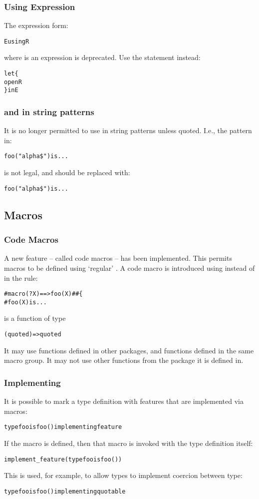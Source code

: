\subsubsection{Using Expression}
The expression form:
\begin{alltt}
E using R
\end{alltt}
where  is an expression is deprecated. Use the  statement instead:
\begin{alltt}
let\{
  open R
\} in E
\end{alltt}

\subsubsection{\q{\$} and \q{\#} in string patterns}
It is no longer permitted to use in string patterns unless quoted. I.e., the pattern in:
\begin{alltt}
foo("alpha\$") is ...
\end{alltt}
is not legal, and should be replaced with:
\begin{alltt}
foo("alpha\bsl\$") is ...
\end{alltt}

\subsection{Macros}

\subsubsection{Code Macros}
A new feature -- called code macros -- has been implemented. This permits macros to be defined using `regular' \Sr. A code macro is introduced using  instead of \q{==>} in the rule:
\begin{alltt}
#macro(?X) ==> foo(X) \#\# \{
  #foo(X) is ...
\end{alltt}
 is a function of type 
\begin{alltt}
(quoted)=>quoted
\end{alltt}
It may use functions defined in other packages, and functions defined in the same macro group. It may not use other functions from the package it is defined in.

\subsubsection{Implementing}
It is possible to mark a type definition with  features that are implemented via macros:
\begin{alltt}
type foo is foo() implementing feature
\end{alltt}
If the macro  is defined, then that macro is invoked with the type definition itself:
\begin{alltt}
implement\_feature(type foo is foo())
\end{alltt}
This is used, for example, to allow types to implement coercion between  type:
\begin{alltt}
type foo is foo() implementing quotable
\end{alltt}

